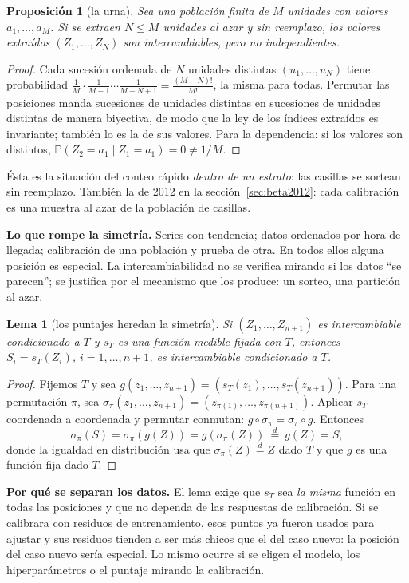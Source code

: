 \documentclass[11pt]{article}
\theoremstyle{plain}
\newtheorem{lema}[teorema]{Lema}
\newtheorem{proposicion}[teorema]{Proposición}
\theoremstyle{definition}
\theoremstyle{remark}
\newcommand{\Prob}{\mathbb P}
\newcommand{\eqd}{\overset{d}{=}}
\newcommand{\dest}[1]{\par\needspace{4\baselineskip}\textbf{#1}\quad}
\begin{document}
\begin{proposicion}[la urna]\label{prop:urna}
Sea una población finita de $M$ unidades con valores $a_1,\dots,a_M$. Si se extraen $N\le M$
unidades al azar y sin reemplazo, los valores extraídos $(Z_1,\dots,Z_N)$ son intercambiables, pero
no independientes.
\end{proposicion}
\begin{proof}
Cada sucesión ordenada de $N$ unidades distintas $(u_1,\dots,u_N)$ tiene probabilidad
$\frac{1}{M}\cdot\frac1{M-1}\cdots\frac1{M-N+1}=\frac{(M-N)!}{M!}$, la misma para todas. Permutar las
posiciones manda sucesiones de unidades distintas en sucesiones de unidades distintas de manera
biyectiva, de modo que la ley de los índices extraídos es invariante; también lo es la de sus
valores. Para la dependencia: si los valores son distintos, $\Prob(Z_2=a_1\mid Z_1=a_1)=0\ne1/M$.
\end{proof}
Ésta es la situación del conteo rápido \emph{dentro de un estrato}: las casillas se sortean sin
reemplazo. También la de 2012 en la sección~\ref{sec:beta2012}: cada calibración es una muestra
al azar de la población de casillas.

\dest{Lo que rompe la simetría.} Series con tendencia; datos ordenados por hora de llegada;
calibración de una población y prueba de otra. En todos ellos alguna posición es especial. La
intercambiabilidad no se verifica mirando si los datos ``se parecen''; se justifica por el
mecanismo que los produce: un sorteo, una partición al azar.

\begin{lema}[los puntajes heredan la simetría]\label{lem:herencia}
Si $(Z_1,\dots,Z_{n+1})$ es intercambiable condicionado a $T$ y $s_T$ es una función medible fijada
con $T$, entonces $S_i=s_T(Z_i)$, $i=1,\dots,n+1$, es intercambiable condicionado a $T$.
\end{lema}
\begin{proof}
Fijemos $T$ y sea $g(z_1,\dots,z_{n+1})=(s_T(z_1),\dots,s_T(z_{n+1}))$. Para una permutación $\pi$,
sea $\sigma_\pi(z_1,\dots,z_{n+1})=(z_{\pi(1)},\dots,z_{\pi(n+1)})$. Aplicar $s_T$ coordenada a
coordenada y permutar conmutan: $g\circ\sigma_\pi=\sigma_\pi\circ g$. Entonces
\[
 \sigma_\pi(S)=\sigma_\pi(g(Z))=g(\sigma_\pi(Z))\ \eqd\ g(Z)=S,
\]
donde la igualdad en distribución usa que $\sigma_\pi(Z)\eqd Z$ dado $T$ y que $g$ es una función
fija dado $T$.
\end{proof}

\dest{Por qué se separan los datos.} El lema exige que $s_T$ sea \emph{la misma} función en todas
las posiciones y que no dependa de las respuestas de calibración. Si se calibrara con residuos de
entrenamiento, esos puntos ya fueron usados para ajustar y sus residuos tienden a ser más chicos que
el del caso nuevo: la posición del caso nuevo sería especial. Lo mismo ocurre si se eligen el modelo,
los hiperparámetros o el puntaje mirando la calibración.
\end{document}
